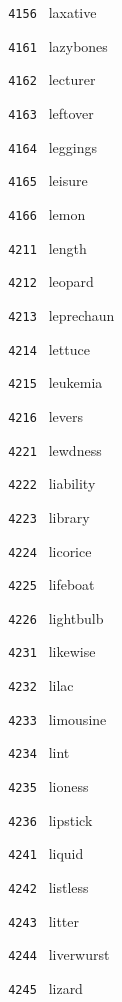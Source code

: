 \documentclass[11pt]{article}
\begin{document}
\begin{multicols}{6}
\noindent \texttt{ 4156 } laxative  \par
\vspace{3mm}
\noindent \texttt{ 4161 } lazybones  \par
\noindent \texttt{ 4162 } lecturer  \par
\noindent \texttt{ 4163 } leftover  \par
\noindent \texttt{ 4164 } leggings  \par
\noindent \texttt{ 4165 } leisure  \par
\noindent \texttt{ 4166 } lemon  \par
\noindent \texttt{ 4211 } length  \par
\noindent \texttt{ 4212 } leopard  \par
\noindent \texttt{ 4213 } leprechaun  \par
\noindent \texttt{ 4214 } lettuce  \par
\noindent \texttt{ 4215 } leukemia  \par
\noindent \texttt{ 4216 } levers  \par
\vspace{3mm}
\noindent \texttt{ 4221 } lewdness  \par
\noindent \texttt{ 4222 } liability  \par
\noindent \texttt{ 4223 } library  \par
\noindent \texttt{ 4224 } licorice  \par
\noindent \texttt{ 4225 } lifeboat  \par
\noindent \texttt{ 4226 } lightbulb  \par
\vspace{3mm}
\noindent \texttt{ 4231 } likewise  \par
\noindent \texttt{ 4232 } lilac  \par
\noindent \texttt{ 4233 } limousine  \par
\noindent \texttt{ 4234 } lint  \par
\noindent \texttt{ 4235 } lioness  \par
\noindent \texttt{ 4236 } lipstick  \par
\vspace{3mm}
\noindent \texttt{ 4241 } liquid  \par
\noindent \texttt{ 4242 } listless  \par
\noindent \texttt{ 4243 } litter  \par
\noindent \texttt{ 4244 } liverwurst  \par
\noindent \texttt{ 4245 } lizard  \par

\end{multicols}
\end{document}

